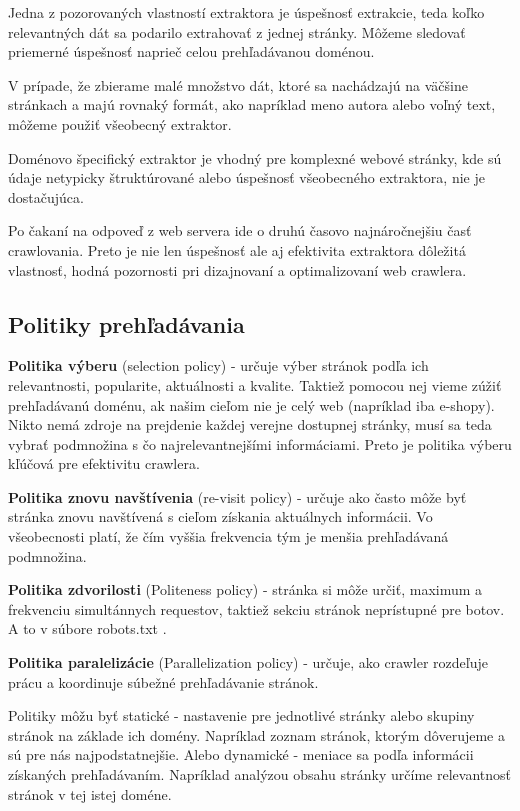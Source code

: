 Jedna z pozorovaných vlastností extraktora je úspešnosť extrakcie, teda koľko relevantných dát sa podarilo extrahovať z jednej stránky. Môžeme sledovať priemerné úspešnosť naprieč celou prehľadávanou doménou.  

V prípade, že zbierame malé množstvo dát, ktoré sa nachádzajú na väčšine stránkach a majú rovnaký formát, ako napríklad meno autora alebo voľný text, môžeme použiť všeobecný extraktor.  

Doménovo špecifický extraktor je vhodný pre komplexné webové stránky, kde sú údaje netypicky štruktúrované alebo úspešnosť všeobecného extraktora, nie je dostačujúca. 

Po čakaní na odpoveď z web servera ide o druhú časovo najnáročnejšiu časť crawlovania. Preto je nie len úspešnosť ale aj efektivita extraktora dôležitá vlastnosť, hodná pozornosti pri dizajnovaní a optimalizovaní web crawlera.

\subsection{Politiky prehľadávania}
\textbf{Politika výberu} (selection policy) - určuje výber stránok podľa ich relevantnosti, popularite, aktuálnosti a kvalite. Taktiež pomocou nej vieme zúžiť prehľadávanú doménu, ak našim cieľom nie je celý web (napríklad iba e-shopy). Nikto nemá zdroje na prejdenie každej verejne dostupnej stránky, musí sa teda vybrať podmnožina s čo najrelevantnejšími informáciami. Preto je politika výberu kľúčová pre efektivitu crawlera. 

\textbf{Politika znovu navštívenia} (re-visit policy) - určuje ako často môže byť stránka znovu navštívená s cieľom získania aktuálnych informácii. Vo všeobecnosti platí, že čím vyššia frekvencia tým je menšia prehľadávaná podmnožina. 

\textbf{Politika zdvorilosti} (Politeness policy) - stránka si môže určiť, maximum a frekvenciu simultánnych requestov, taktiež sekciu stránok neprístupné pre botov. A to v súbore robots.txt \cite{robotsTxt}. 

\textbf{Politika paralelizácie} (Parallelization policy) - určuje, ako crawler rozdeľuje prácu a koordinuje súbežné prehľadávanie stránok. 

Politiky môžu byť statické - nastavenie pre jednotlivé stránky alebo skupiny stránok na základe ich domény. Napríklad zoznam stránok, ktorým dôverujeme a sú pre nás najpodstatnejšie. 
Alebo dynamické - meniace sa podľa informácii získaných prehľadávaním. Napríklad analýzou obsahu stránky určíme relevantnosť stránok v tej istej doméne. 


